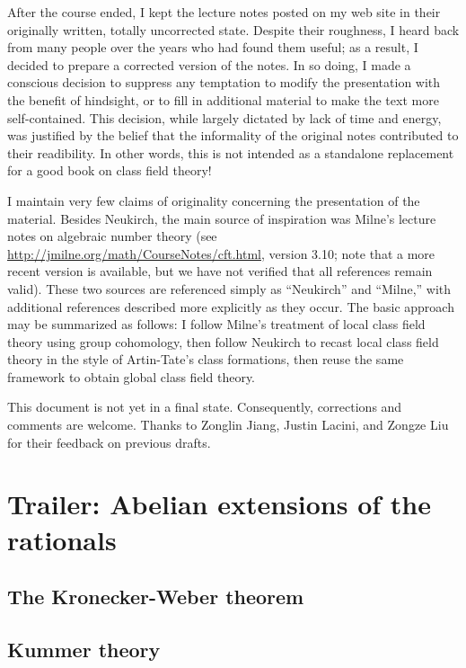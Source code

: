 \documentclass{amsbook}
\begin{document}
After the course ended, I kept the lecture notes posted on my web site in their originally written, totally uncorrected state.
Despite their roughness, I heard back from many people over the years who had found them useful;
as a result, I decided to prepare a corrected version of the notes. In so doing, I made a conscious decision
to suppress any temptation to modify 
the presentation with the benefit of hindsight, or to fill in additional material to make the text more self-contained.
This decision, while largely dictated by lack of time and energy, was justified by the belief that the
informality of the original notes contributed to their readibility. In other words, this is not intended as a standalone
replacement for a good book on class field theory!

I maintain very few claims of originality concerning the presentation of the material. 
Besides Neukirch, the main source of inspiration was Milne's lecture notes on algebraic number theory (see \url{http://jmilne.org/math/CourseNotes/cft.html}, version 3.10; note that a more recent version is available, but we have not verified that all references remain valid). These two sources are referenced simply as ``Neukirch'' and ``Milne,'' with additional references described more explicitly  as they occur.
The basic approach may be summarized as follows: I follow Milne's treatment of local class field theory using group cohomology, then follow Neukirch to recast local class field theory in the style of Artin-Tate's class formations, then reuse the same framework to obtain global class field theory. 

This document is not yet in a final state. Consequently, corrections and comments are welcome. Thanks to Zonglin Jiang, Justin Lacini, and Zongze Liu for their feedback on previous drafts.

\mainmatter
\part{Trailer: Abelian extensions of the rationals}

\chapter{The Kronecker-Weber theorem}


\chapter{Kummer theory}
\label{chap:Kummer theory}

\end{document}
